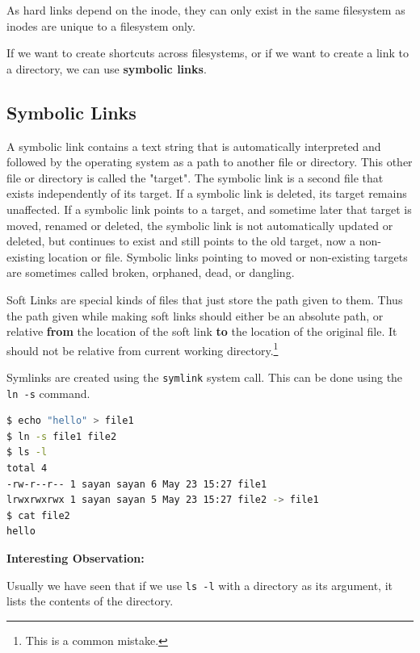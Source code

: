 As hard links depend on the inode, they can only exist in the same filesystem as inodes are unique to a filesystem only.

If we want to create shortcuts across filesystems, or if we want to create a link to a directory, we can use \textbf{symbolic links}.

\subsection{Symbolic Links}

A symbolic link contains a text string that is automatically interpreted and followed by the operating system as a path to another file or directory.
This other file or directory is called the "target".
The symbolic link is a second file that exists independently of its target.
If a symbolic link is deleted, its target remains unaffected.
If a symbolic link points to a target, and sometime later that target is moved, renamed or deleted, the symbolic link is not automatically updated or deleted, but continues to exist and still points to the old target, now a non-existing location or file.
Symbolic links pointing to moved or non-existing targets are sometimes called broken, orphaned, dead, or dangling.

\begin{definition}
  Soft Links are special kinds of files that just store the path
  given to them. Thus the path given while making soft links should
  either be an absolute path, or relative \textbf{from} the location of the
  soft link \textbf{to} the location of the original file. It should not be
  relative from current working directory.\footnote{This is a common mistake.}
\end{definition}

Symlinks are created using the \texttt{symlink} system call.
This can be done using the \texttt{ln -s} command.

\begin{lstlisting}[language=bash]
$ echo "hello" > file1
$ ln -s file1 file2
$ ls -l
total 4
-rw-r--r-- 1 sayan sayan 6 May 23 15:27 file1
lrwxrwxrwx 1 sayan sayan 5 May 23 15:27 file2 -> file1
$ cat file2
hello
\end{lstlisting}

\textbf{Interesting Observation:}

Usually we have seen that if we use \texttt{ls -l} with a directory as its argument,
it lists the contents of the directory.

